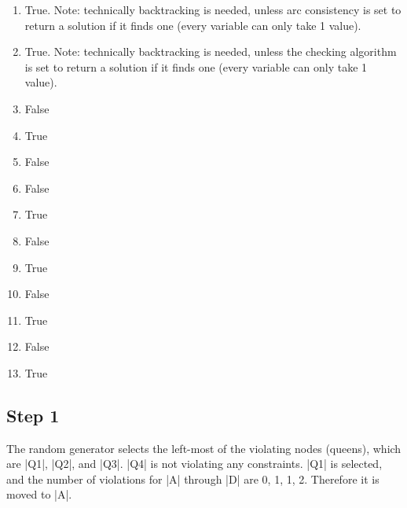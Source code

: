 \documentclass{homework}
\begin{document}
\exercise[2]
\begin{enumerate}
    \item True. Note: technically backtracking is needed, unless arc consistency is set to return a solution if it finds one (every variable can only take 1 value). %
    \item True. Note: technically backtracking is needed, unless the checking algorithm is set to return a solution if it finds one (every variable can only take 1 value). %
    \item False %
    \item True %
    \item False %
    \item False %
    \item True %
    \item False %
    \item True %
    \item False %
    \item True %
    \item False %
    \item True %
    
\end{enumerate}

\clearpage
\exercise[3]


\subsection{Step 1}
The random generator selects the left-most of the violating nodes (queens), which are \cverb|Q1|, \cverb|Q2|, and \cverb|Q3|. \cverb|Q4| is not violating any constraints.
\cverb|Q1| is selected, and the number of violations for \cverb|A| through \cverb|D| are 0, 1, 1, 2. Therefore it is moved to \cverb|A|.

\end{document}
